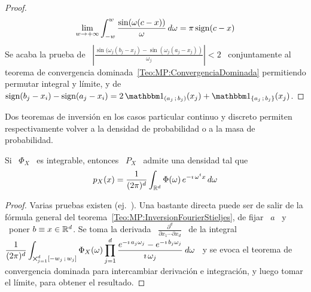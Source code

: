 {\begin{proof}
  \[
  \lim_{w \to  +\infty} \int_{-w}^w \frac{\sin(\omega  (c - x))}{\omega}
  \, d\omega = \pi \operatorname{sign}(c-x)
  \]
  Se  acaba  la   prueba  de  \  $\left|  \frac{\sin(\omega_j   (b_j  -  x_j)  -
      \sin(\omega_j  (a_j -  x_j))}{\omega_j} \right|  < 2$  \  conjuntamente al
  teorema de convergencia dominada~\ref{Teo:MP:ConvergenciaDominada} permitiendo
  permutar integral  y l\'imite,  y de $\sign(b_j-x_i)  - \sign(a_j-x_i) =  2 \,
  \un_{\left(   a_j   \;  b_j   \right)}(x_j)   +   \un_{\left\{   a_j  \;   b_j
    \right\}}(x_j)$.
\end{proof}

Dos teoremas de inversi\'on en los casos particular continuo y discreto permiten
respectivamente  volver  a   la  densidad  de  probabilidad  o   a  la  masa  de
probabilidad.
%
\begin{teorema}\label{Teo:MP:InversionDensidad}
%
  Si \ $\Phi_X$ \ es integrable, entonces \ $P_X$ \ admite una densidad tal que
  \[
  p_X(x)  =  \frac{1}{(2  \pi)^d}  \int_{\mathbb{R}^d} \Phi(\omega) \, e^{-  \imath  \,
    \omega^t x} \, d\omega
\]
\end{teorema}
%
\begin{proof}
  Varias pruebas  existen (ej.~\cite[p.~21]{Sas13}). Una  bastante directa puede
  ser       de      salir      de       la      f\'ormula       general      del
  teorema~\ref{Teo:MP:InversionFourierStieljes}, de  fijar \ $a$ \ y  \ poner $b
  \equiv x \in  \mathbb{R}^d$. Se toma la derivada  \ $\frac{\partial^d}{\partial x_1
    \cdots \partial x_d}$ \ de  la integral \ $\displaystyle \frac{1}{(2 \pi)^d}
  \int_{\operatorname*{\bigtimes}_{j=1}^d   [-w_j  \, ; \,  w_j]}   \Phi_X(\omega)  \prod_{j   =  1}^d
  \frac{e^{- \imath \,  a_j \omega_j} - e^{- \imath  \, b_j \omega_j}}{\imath \,
    \omega_j} \: d\omega$ \ y se  evoca el teorema de convergencia dominada para
  intercambiar  derivaci\'on e integraci\'on,  y luego  tomar el  l\'imite, para
  obtener el resultado.
\end{proof}

}

